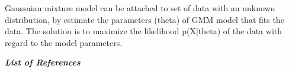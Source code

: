 Gaussaian mixture model can be attached to set of data  with an unknown distribution, by estimate the parameters (theta) of GMM model that fits the data. The solution is to maximize the likelihood p(X|theta) of the data with regard to the model parameters. 


\textit{\textbf{List of References}}\\
\cite{09a1}